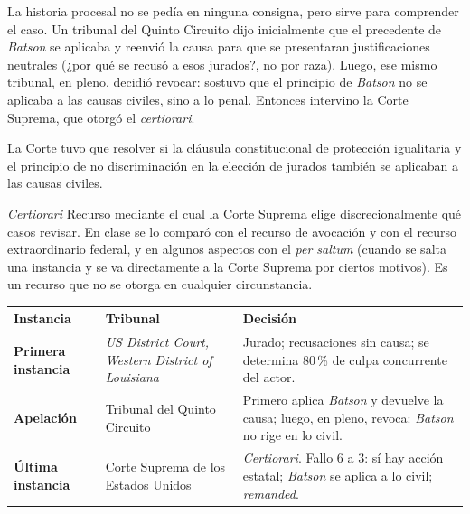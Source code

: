 \documentclass[12pt,oneside]{book}
\begin{document}
La historia procesal no se pedía en ninguna consigna, pero sirve para comprender el caso. Un tribunal del Quinto Circuito dijo inicialmente que el precedente de \textit{Batson} se aplicaba y reenvió la causa para que se presentaran justificaciones neutrales (¿por qué se recusó a esos jurados?, no por raza). Luego, ese mismo tribunal, en pleno, decidió revocar: sostuvo que el principio de \textit{Batson} no se aplicaba a las causas civiles, sino a lo penal. Entonces intervino la Corte Suprema, que otorgó el \textit{certiorari}.

La Corte tuvo que resolver si la cláusula constitucional de protección igualitaria y el principio de no discriminación en la elección de jurados también se aplicaban a las causas civiles.

\begin{definition}{\textit{Certiorari}}
Recurso mediante el cual la Corte Suprema elige discrecionalmente qué casos revisar. En clase se lo comparó con el recurso de avocación y con el recurso extraordinario federal, y en algunos aspectos con el \textit{per saltum} (cuando se salta una instancia y se va directamente a la Corte Suprema por ciertos motivos). Es un recurso que no se otorga en cualquier circunstancia.
\end{definition}

\begin{table}[H]
\centering
\renewcommand{\arraystretch}{1.3}
\begin{tabularx}{\textwidth}{
    >{\raggedright\arraybackslash}p{}
    >{\raggedright\arraybackslash}p{}
    >{\raggedright\arraybackslash}X
}
\toprule
\textbf{Instancia} & \textbf{Tribunal} & \textbf{Decisión} \\
\midrule
\textbf{Primera instancia} & \textit{US District Court, Western District of Louisiana} & Jurado; recusaciones sin causa; se determina 80\,\% de culpa concurrente del actor. \\
\addlinespace
\textbf{Apelación} & Tribunal del Quinto Circuito & Primero aplica \textit{Batson} y devuelve la causa; luego, en pleno, revoca: \textit{Batson} no rige en lo civil. \\
\addlinespace
\textbf{Última instancia} & Corte Suprema de los Estados Unidos & \textit{Certiorari}. Fallo 6 a 3: sí hay acción estatal; \textit{Batson} se aplica a lo civil; \textit{remanded}. \\
\bottomrule
\end{tabularx}
\end{table}
\end{document}
